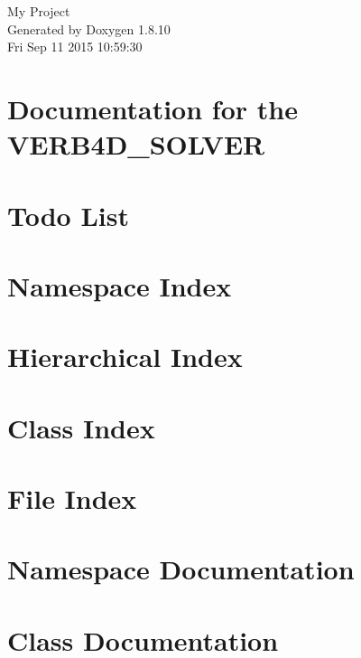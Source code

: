 \documentclass[twoside]{book}
\newcommand{\+}{\discretionary{\mbox{\scriptsize$\hookleftarrow$}}{}{}}
\newcommand{\clearemptydoublepage}{%
  \newpage{\pagestyle{empty}\cleardoublepage}%
}
\begin{document}
\hypersetup{pageanchor=false,
             bookmarks=true,
             bookmarksnumbered=true,
             pdfencoding=unicode
            }
\begin{titlepage}
\vspace*{7cm}
\begin{center}%
{\Large My Project }\\
\vspace*{1cm}
{\large Generated by Doxygen 1.8.10}\\
\vspace*{0.5cm}
{\small Fri Sep 11 2015 10:59:30}\\
\end{center}
\end{titlepage}
\clearemptydoublepage
\tableofcontents
\clearemptydoublepage
{}
\hypersetup{pageanchor=true}

\chapter{Documentation for the V\+E\+R\+B4\+D\+\_\+\+S\+O\+L\+V\+E\+R}
\label{index}\hypertarget{index}{}
\chapter{Todo List}
\label{todo}
\hypertarget{todo}{}

\chapter{Namespace Index}

\chapter{Hierarchical Index}

\chapter{Class Index}

\chapter{File Index}

\chapter{Namespace Documentation}

\chapter{Class Documentation}














\end{document}
